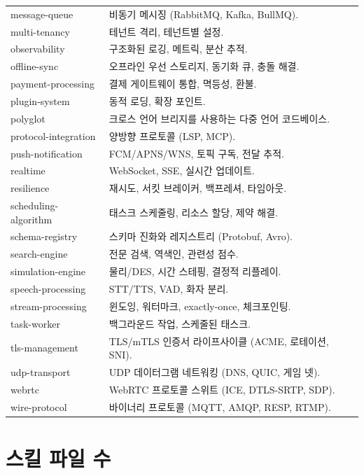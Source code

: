 \documentclass[11pt,a4paper,openright,twoside]{report}
\begin{document}
\begin{longtable}{lp{9cm}}
message-queue & 비동기 메시징 (RabbitMQ, Kafka, BullMQ). \\
multi-tenancy & 테넌트 격리, 테넌트별 설정. \\
observability & 구조화된 로깅, 메트릭, 분산 추적. \\
offline-sync & 오프라인 우선 스토리지, 동기화 큐, 충돌 해결. \\
payment-processing & 결제 게이트웨이 통합, 멱등성, 환불. \\
plugin-system & 동적 로딩, 확장 포인트. \\
polyglot & 크로스 언어 브리지를 사용하는 다중 언어 코드베이스. \\
protocol-integration & 양방향 프로토콜 (LSP, MCP). \\
push-notification & FCM/APNS/WNS, 토픽 구독, 전달 추적. \\
realtime & WebSocket, SSE, 실시간 업데이트. \\
resilience & 재시도, 서킷 브레이커, 백프레셔, 타임아웃. \\
scheduling-algorithm & 태스크 스케줄링, 리소스 할당, 제약 해결. \\
schema-registry & 스키마 진화와 레지스트리 (Protobuf, Avro). \\
search-engine & 전문 검색, 역색인, 관련성 점수. \\
simulation-engine & 물리/DES, 시간 스테핑, 결정적 리플레이. \\
speech-processing & STT/TTS, VAD, 화자 분리. \\
stream-processing & 윈도잉, 워터마크, exactly-once, 체크포인팅. \\
task-worker & 백그라운드 작업, 스케줄된 태스크. \\
tls-management & TLS/mTLS 인증서 라이프사이클 (ACME, 로테이션, SNI). \\
udp-transport & UDP 데이터그램 네트워킹 (DNS, QUIC, 게임 넷). \\
webrtc & WebRTC 프로토콜 스위트 (ICE, DTLS-SRTP, SDP). \\
wire-protocol & 바이너리 프로토콜 (MQTT, AMQP, RESP, RTMP). \\
\bottomrule
\end{longtable}

\section{스킬 파일 수}
\end{document}
